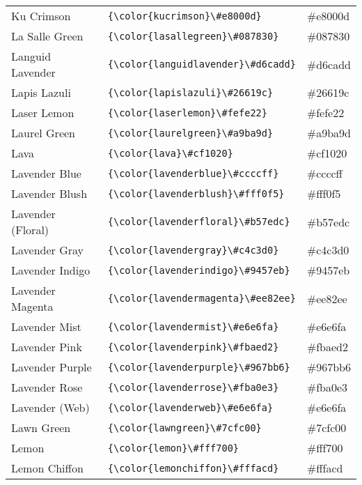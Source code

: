 \documentclass[9.5pt]{article}
\begin{document}
\begin{longtable}{l | l | l}
	Ku Crimson & \verb!{\color{kucrimson}\#e8000d}! & {\color{kucrimson}\#e8000d}\\
	La Salle Green & \verb!{\color{lasallegreen}\#087830}! & {\color{lasallegreen}\#087830}\\
	Languid Lavender & \verb!{\color{languidlavender}\#d6cadd}! & {\color{languidlavender}\#d6cadd}\\
	Lapis Lazuli & \verb!{\color{lapislazuli}\#26619c}! & {\color{lapislazuli}\#26619c}\\
	Laser Lemon & \verb!{\color{laserlemon}\#fefe22}! & {\color{laserlemon}\#fefe22}\\
	Laurel Green & \verb!{\color{laurelgreen}\#a9ba9d}! & {\color{laurelgreen}\#a9ba9d}\\
	Lava & \verb!{\color{lava}\#cf1020}! & {\color{lava}\#cf1020}\\
	Lavender Blue & \verb!{\color{lavenderblue}\#ccccff}! & {\color{lavenderblue}\#ccccff}\\
	Lavender Blush & \verb!{\color{lavenderblush}\#fff0f5}! & {\color{lavenderblush}\#fff0f5}\\
	Lavender (Floral) & \verb!{\color{lavenderfloral}\#b57edc}! & {\color{lavenderfloral}\#b57edc}\\
	Lavender Gray & \verb!{\color{lavendergray}\#c4c3d0}! & {\color{lavendergray}\#c4c3d0}\\
	Lavender Indigo & \verb!{\color{lavenderindigo}\#9457eb}! & {\color{lavenderindigo}\#9457eb}\\
	Lavender Magenta & \verb!{\color{lavendermagenta}\#ee82ee}! & {\color{lavendermagenta}\#ee82ee}\\
	Lavender Mist & \verb!{\color{lavendermist}\#e6e6fa}! & {\color{lavendermist}\#e6e6fa}\\
	Lavender Pink & \verb!{\color{lavenderpink}\#fbaed2}! & {\color{lavenderpink}\#fbaed2}\\
	Lavender Purple & \verb!{\color{lavenderpurple}\#967bb6}! & {\color{lavenderpurple}\#967bb6}\\
	Lavender Rose & \verb!{\color{lavenderrose}\#fba0e3}! & {\color{lavenderrose}\#fba0e3}\\
	Lavender (Web) & \verb!{\color{lavenderweb}\#e6e6fa}! & {\color{lavenderweb}\#e6e6fa}\\
	Lawn Green & \verb!{\color{lawngreen}\#7cfc00}! & {\color{lawngreen}\#7cfc00}\\
	Lemon & \verb!{\color{lemon}\#fff700}! & {\color{lemon}\#fff700}\\
	Lemon Chiffon & \verb!{\color{lemonchiffon}\#fffacd}! & {\color{lemonchiffon}\#fffacd}\\

\end{longtable}
\end{document}
